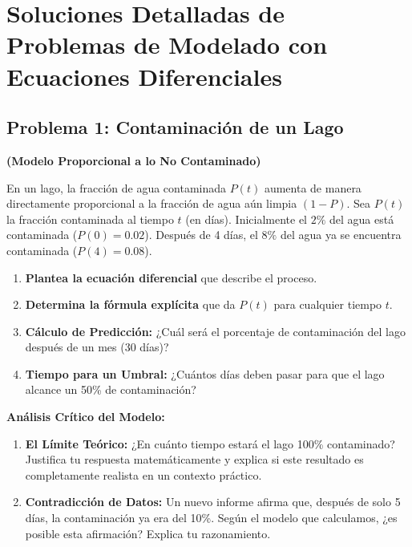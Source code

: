 \documentclass[12pt, a4paper]{article}
\begin{document}
\section*{Soluciones Detalladas de Problemas de Modelado con Ecuaciones Diferenciales}

\tableofcontents
\newpage

\subsection*{Problema 1: Contaminación de un Lago}

\noindent \textbf{(Modelo Proporcional a lo No Contaminado)}

En un lago, la fracción de agua contaminada $P(t)$ aumenta de manera directamente proporcional a la fracción de agua aún limpia $(1-P)$. Sea $P(t)$ la fracción contaminada al tiempo $t$ (en días). Inicialmente el $2\%$ del agua está contaminada ($P(0) = 0.02$). Después de 4 días, el $8\%$ del agua ya se encuentra contaminada ($P(4) = 0.08$).

\begin{enumerate}[label=\textbf{A\arabic*.},font=\bfseries]
    \item \textbf{Plantea la ecuación diferencial} que describe el proceso.
    \item \textbf{Determina la fórmula explícita} que da $P(t)$ para cualquier tiempo $t$.
    \item \textbf{Cálculo de Predicción:} ¿Cuál será el porcentaje de contaminación del lago después de un mes (30 días)?
    \item \textbf{Tiempo para un Umbral:} ¿Cuántos días deben pasar para que el lago alcance un 50\% de contaminación?
\end{enumerate}

\noindent \textbf{Análisis Crítico del Modelo:}
\begin{enumerate}[label=\textbf{E\arabic*.},start=1,font=\bfseries]
    \item \textbf{El Límite Teórico:} ¿En cuánto tiempo estará el lago 100\% contaminado? Justifica tu respuesta matemáticamente y explica si este resultado es completamente realista en un contexto práctico.
    \item \textbf{Contradicción de Datos:} Un nuevo informe afirma que, después de solo 5 días, la contaminación ya era del 10\%. Según el modelo que calculamos, ¿es posible esta afirmación? Explica tu razonamiento.
\end{enumerate}
\end{document}
